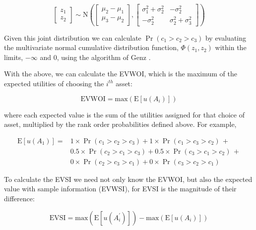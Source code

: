 \documentclass[]{article}
\theoremstyle{definition}
\theoremstyle{definition}
\theoremstyle{remark}
\begin{document}
\begin{equation}
\begin{bmatrix}z_1\\z_2\end{bmatrix}
  \sim\mathrm{N}\left(
  \begin{bmatrix}\mu_2-\mu_1\\\mu_3-\mu_2\end{bmatrix},
  \begin{bmatrix}\sigma^2_1+\sigma^2_2&-\sigma^2_2\\-\sigma^2_2&\sigma^2_2+\sigma^2_3\end{bmatrix}\right)
\label{eq:jointz}
\end{equation}

Given this joint distribution we can calculate \(\Pr(c_1 > c_2 > c_3)\)
by evaluating the multivariate normal cumulative distribution function,
\(\Phi(z_1, z_2)\) within the limits, \(-\infty\) and \(0\), using the
algorithm of Genz \citeyearpar{Genz1992}.

With the above, we can calculate the EVWOI, which is the maximum of the
expected utilities of choosing the \(i^{th}\) asset:

\begin{equation}
\mathrm{EVWOI} = \mathrm{max}(\mathrm{E}[u(A_i)])
\label{eq:EVWOIheu}
\end{equation}

where each expected value is the sum of the utilities assigned for that
choice of asset, multiplied by the rank order probabilities defined
above. For example,

\begin{equation}
\begin{aligned}
  \mathrm{E}[u(A_1)] = & 1 \times \Pr(c_1 > c_2 > c_3) + 1 \times \Pr(c_1 > c_3 > c_2)\,+ \\
  &0.5 \times \Pr(c_2 > c_1 > c_3) + 0.5 \times \Pr(c_3 > c_1 > c_2)\,+ \\
  &0 \times \Pr(c_2 > c_3 > c_1) + 0 \times \Pr(c_3 > c_2 > c_1)
\end{aligned}
\label{eq:EuA1}
\end{equation}

To calculate the EVSI we need not only know the EVWOI, but also the
expected value with sample information (EVWSI), for EVSI is the
magnitude of their difference:

\begin{equation}
\mathrm{EVSI} = \mathrm{max}(\mathrm{E}[u(A^\prime_i)]) - \mathrm{max}(\mathrm{E}[u(A_i)])
\label{eq:EVSIheu}
\end{equation}
\end{document}
